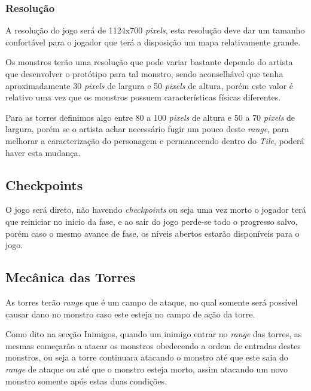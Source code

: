 \documentclass[11pt]{article} %
\begin{document}
\subsubsection{Resolução}
A resolução do jogo será de 1124x700 \textit{pixels}, esta resolução deve dar um tamanho confortável para o jogador que terá a disposição um mapa relativamente grande.

Os monstros terão uma resolução que pode variar bastante dependo do artista que desenvolver o protótipo para tal monstro, sendo aconselhável que tenha aproximadamente 30 \textit{pixels} de largura e 50 \textit{pixels} de altura, porém este valor é relativo uma vez que os monstros possuem características físicas diferentes.

Para as torres definimos algo entre 80 a 100 \textit{pixels} de altura e 50 a 70 \textit{pixels} de largura, porém se o artista achar necessário fugir um pouco deste \textit{range}, para melhorar a caracterização do personagem e permanecendo dentro do \textit{Tile}, poderá haver esta mudança.

\subsection{Checkpoints}
O jogo será direto, não havendo \textit{checkpoints} ou seja uma vez morto o jogador terá que reiniciar no inicio da fase, e ao sair do jogo perde-se todo o progresso salvo, porém caso o mesmo avance de fase, os níveis abertos estarão disponíveis para o jogo.

\subsection{Mecânica das Torres}

As torres terão \textit{range} que é um campo de ataque, no qual somente será possível causar dano no monstro caso este esteja no campo de ação da torre.

Como dito na secção Inimigos, quando um inimigo entrar no \textit{range} das torres, as mesmas começarão a atacar os monstros obedecendo a ordem de entradas destes monstros, ou seja a torre continuara atacando o monstro até que este saia do \textit{range} de ataque ou até que o monstro esteja morto, assim atacando um novo monstro somente após estas duas condições.
\end{document}
